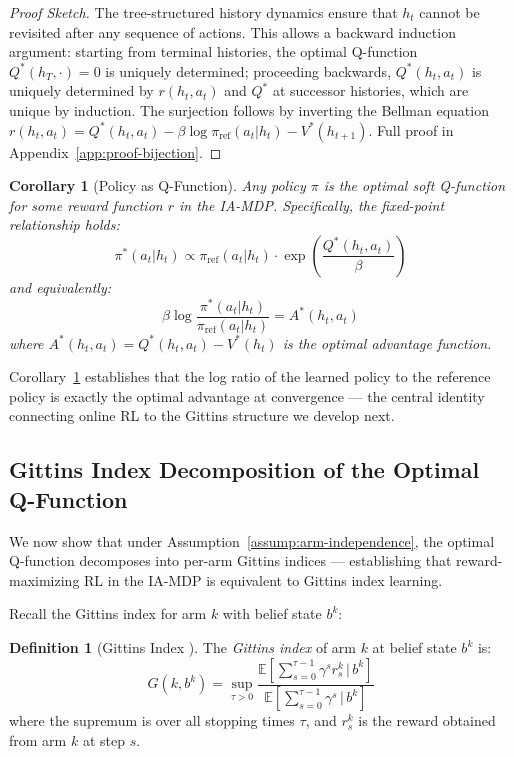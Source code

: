 \documentclass[11pt]{article}
\theoremstyle{plain}
\newtheorem{corollary}[theorem]{Corollary}
\theoremstyle{definition}
\newtheorem{definition}[theorem]{Definition}
\theoremstyle{remark}
\begin{document}
\begin{proof}[Proof Sketch]
The tree-structured history dynamics ensure that $h_t$ cannot 
be revisited after any sequence of actions. This allows a 
backward induction argument: starting from terminal histories, 
the optimal Q-function $Q^*(h_T, \cdot) = 0$ is uniquely 
determined; proceeding backwards, $Q^*(h_t, a_t)$ is uniquely 
determined by $r(h_t, a_t)$ and $Q^*$ at successor histories, 
which are unique by induction. The surjection follows by 
inverting the Bellman equation $r(h_t, a_t) = Q^*(h_t, a_t) - 
\beta \log \pi_\mathrm{ref}(a_t|h_t) - V^*(h_{t+1})$.
Full proof in Appendix~\ref{app:proof-bijection}.
\end{proof}

\begin{corollary}[Policy as Q-Function]
\label{cor:policy-as-q}
Any policy $\pi$ is the optimal soft Q-function for some reward 
function $r$ in the IA-MDP. Specifically, the fixed-point 
relationship holds:
$$\pi^*(a_t|h_t) \propto \pi_\mathrm{ref}(a_t|h_t) \cdot 
\exp\!\left(\frac{Q^*(h_t, a_t)}{\beta}\right)$$
and equivalently:
$$\beta \log \frac{\pi^*(a_t|h_t)}{\pi_\mathrm{ref}(a_t|h_t)} 
= A^*(h_t, a_t)$$
where $A^*(h_t, a_t) = Q^*(h_t, a_t) - V^*(h_t)$ is the 
optimal advantage function.
\end{corollary}

Corollary~\ref{cor:policy-as-q} establishes that the log ratio 
of the learned policy to the reference policy is exactly the 
optimal advantage at convergence — the central identity 
connecting online RL to the Gittins structure we develop next.

\subsection{Gittins Index Decomposition of the Optimal Q-Function}

We now show that under Assumption~\ref{assump:arm-independence}, 
the optimal Q-function decomposes into per-arm Gittins indices 
— establishing that reward-maximizing RL in the IA-MDP is 
equivalent to Gittins index learning.

Recall the Gittins index for arm $k$ with belief state $b^k$:

\begin{definition}[Gittins Index \citep{gittins1979bandit}]
\label{def:gittins}
The \emph{Gittins index} of arm $k$ at belief state $b^k$ is:
$$G(k, b^k) = \sup_{\tau > 0} 
\frac{\mathbb{E}\!\left[\sum_{s=0}^{\tau-1} \gamma^s 
r_s^k \,\Big|\, b^k\right]}
{\mathbb{E}\!\left[\sum_{s=0}^{\tau-1} \gamma^s 
\,\Big|\, b^k\right]}$$
where the supremum is over all stopping times $\tau$, and 
$r_s^k$ is the reward obtained from arm $k$ at step $s$.
\end{definition}
\end{document}
